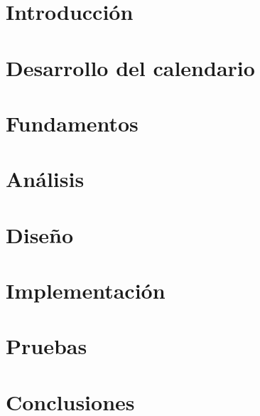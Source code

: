 \documentclass[a4paper,12pt]{scrbook}
\begin{document}
\cleardoublepage

\tableofcontents
\listoffigures

\setlength{\parskip}{1.2ex plus 0.4ex minus 0.1ex}

\chapter{Introducción}
\label{chap:introduccion}


\chapter{Desarrollo del calendario}
\label{chap:calendario}


%
 
\chapter{Fundamentos}
\label{chap:fundamentos}


\chapter{Análisis}
\label{chap:analisis}


\chapter{Diseño}
\label{chap:diseno}


\chapter{Implementación}
\label{chap:implementacion}


\chapter{Pruebas}
\label{chap:pruebas}


\chapter{Conclusiones}
\label{chap:conclusiones}

\end{document}
